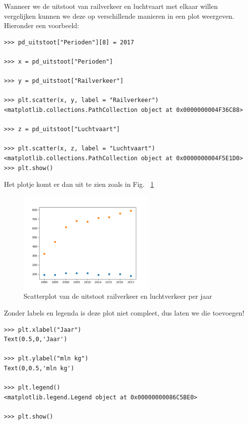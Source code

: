 Wanneer we de uitstoot van railverkeer en luchtvaart met elkaar willen vergelijken kunnen we deze op verschillende manieren in een plot weergeven. Hieronder een voorbeeld:

\begin{lstlisting}[frame=single]
>>> pd_uitstoot["Perioden"][8] = 2017

>>> x = pd_uitstoot["Perioden"]

>>> y = pd_uitstoot["Railverkeer"]

>>> plt.scatter(x, y, label = "Railverkeer")
<matplotlib.collections.PathCollection object at 0x0000000004F36C88>

>>> z = pd_uitstoot["Luchtvaart"]

>>> plt.scatter(x, z, label = "Luchtvaart")
<matplotlib.collections.PathCollection object at 0x0000000004F5E1D0>
>>> plt.show()
\end{lstlisting}

Het plotje komt er dan uit te zien zoals in Fig. ~\ref{fig:matplotlib_scatter_1}

\begin{figure}[h]
\begin{center}
\includegraphics[width=0.6\textwidth]{img/matplotlib_scatter_1.png}
\caption{\label{fig:matplotlib_scatter_1} Scatterplot van de uitstoot railverkeer en luchtverkeer per jaar}
\end{center}
\end{figure}

Zonder labels en legenda is deze plot niet compleet, dus laten we die toevoegen!

\begin{lstlisting}[frame=single]
>>> plt.xlabel("Jaar")
Text(0.5,0,'Jaar')

>>> plt.ylabel("mln kg")
Text(0,0.5,'mln kg')

>>> plt.legend()
<matplotlib.legend.Legend object at 0x00000000086C5BE0>

>>> plt.show()

\end{lstlisting}

